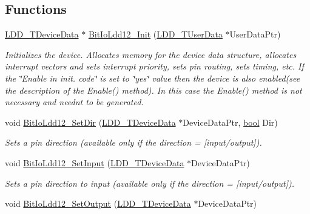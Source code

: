\subsection*{Functions}
\begin{DoxyCompactItemize}
\item 
\hyperlink{group___p_e___types__module_gac5cf1362f1f0e3a2ce71b1bf2276d091}{L\+D\+D\+\_\+\+T\+Device\+Data} $\ast$ \hyperlink{group___bit_io_ldd12__module_ga504f7c338d40c89bfbb418cd2c1c3a8b}{Bit\+Io\+Ldd12\+\_\+\+Init} (\hyperlink{group___p_e___types__module_ga0b66a73f87238a782318aa0be7578e35}{L\+D\+D\+\_\+\+T\+User\+Data} $\ast$User\+Data\+Ptr)
\begin{DoxyCompactList}\small\item\em Initializes the device. Allocates memory for the device data structure, allocates interrupt vectors and sets interrupt priority, sets pin routing, sets timing, etc. If the \char`\"{}\+Enable
    in init. code\char`\"{} is set to \char`\"{}yes\char`\"{} value then the device is also enabled(see the description of the Enable() method). In this case the Enable() method is not necessary and needn\textquotesingle{}t to be generated. \end{DoxyCompactList}\item 
void \hyperlink{group___bit_io_ldd12__module_ga540c0e8c513ca036a0066aab8833f0ad}{Bit\+Io\+Ldd12\+\_\+\+Set\+Dir} (\hyperlink{group___p_e___types__module_gac5cf1362f1f0e3a2ce71b1bf2276d091}{L\+D\+D\+\_\+\+T\+Device\+Data} $\ast$Device\+Data\+Ptr, \hyperlink{group___p_e___types__module_ga97a80ca1602ebf2303258971a2c938e2}{bool} Dir)
\begin{DoxyCompactList}\small\item\em Sets a pin direction (available only if the direction = {\itshape \mbox{[}input/output\mbox{]}}). \end{DoxyCompactList}\item 
void \hyperlink{group___bit_io_ldd12__module_gaf2e24cfdf7dd3071178d0061abb29c56}{Bit\+Io\+Ldd12\+\_\+\+Set\+Input} (\hyperlink{group___p_e___types__module_gac5cf1362f1f0e3a2ce71b1bf2276d091}{L\+D\+D\+\_\+\+T\+Device\+Data} $\ast$Device\+Data\+Ptr)
\begin{DoxyCompactList}\small\item\em Sets a pin direction to input (available only if the direction = {\itshape \mbox{[}input/output\mbox{]}}). \end{DoxyCompactList}\item 
void \hyperlink{group___bit_io_ldd12__module_gab9c2b2a95e81ed484e4328f795f0e827}{Bit\+Io\+Ldd12\+\_\+\+Set\+Output} (\hyperlink{group___p_e___types__module_gac5cf1362f1f0e3a2ce71b1bf2276d091}{L\+D\+D\+\_\+\+T\+Device\+Data} $\ast$Device\+Data\+Ptr)

\end{DoxyCompactItemize}
